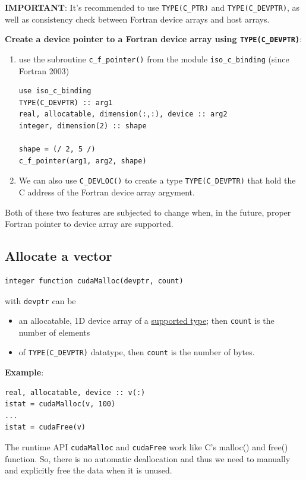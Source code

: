 {\bf IMPORTANT}: It's recommended to use \verb!TYPE(C_PTR)! and
\verb!TYPE(C_DEVPTR)!, as well as consistency check between Fortran
device arrays and host arrays. 

{\bf Create a device pointer to a Fortran device array using
  \verb!TYPE(C_DEVPTR)!}:
\begin{enumerate}
\item use the subroutine \verb!c_f_pointer()! from the module
  \verb!iso_c_binding! (since Fortran 2003)
\begin{lstlisting}
use iso_c_binding
TYPE(C_DEVPTR) :: arg1
real, allocatable, dimension(:,:), device :: arg2
integer, dimension(2) :: shape

shape = (/ 2, 5 /)
c_f_pointer(arg1, arg2, shape)
\end{lstlisting}

\item We can also use \verb!C_DEVLOC()! to create a type
  \verb!TYPE(C_DEVPTR)! that hold the C address of the Fortran device
  array argyment.
\end{enumerate}
Both of these two features are subjected to change when, in the
future, proper Fortran pointer to device array are supported.

\subsection{Allocate a vector}
\label{sec:allocate-vector}

\begin{lstlisting}
integer function cudaMalloc(devptr, count)
\end{lstlisting}
with \verb!devptr! can be
\begin{itemize}
\item an allocatable, 1D device array of a
\hyperref[sec:datatype-data-device]{supported type}; then \verb!count!
is the number of elements

\item of \verb!TYPE(C_DEVPTR)! datatype, then \verb!count! is the
  number of bytes. 

\end{itemize}

{\bf Example}:
\begin{lstlisting}
real, allocatable, device :: v(:)
istat = cudaMalloc(v, 100)
...
istat = cudaFree(v)
\end{lstlisting}
The runtime API \verb.cudaMalloc. and \verb.cudaFree. work like C's
malloc() and free() function. So, there is no automatic deallocation
and thus we need to manually and explicitly free the data when it is
unused.

